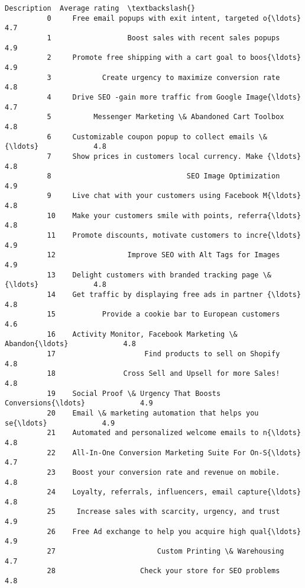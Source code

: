 \documentclass[11pt]{article}
\begin{document}
\begin{Verbatim}[commandchars=\\\{\}]
                                                      Description  Average rating  \textbackslash{}
          0     Free email popups with exit intent, targeted o{\ldots}             4.7   
          1                  Boost sales with recent sales popups             4.9   
          2     Promote free shipping with a cart goal to boos{\ldots}             4.9   
          3            Create urgency to maximize conversion rate             4.8   
          4     Drive SEO -gain more traffic from Google Image{\ldots}             4.7   
          5          Messenger Marketing \& Abandoned Cart Toolbox             4.8   
          6     Customizable coupon popup to collect emails \& {\ldots}             4.8   
          7     Show prices in customers local currency. Make {\ldots}             4.8   
          8                                SEO Image Optimization             4.9   
          9     Live chat with your customers using Facebook M{\ldots}             4.8   
          10    Make your customers smile with points, referra{\ldots}             4.8   
          11    Promote discounts, motivate customers to incre{\ldots}             4.9   
          12                 Improve SEO with Alt Tags for Images             4.9   
          13    Delight customers with branded tracking page \&{\ldots}             4.8   
          14    Get traffic by displaying free ads in partner {\ldots}             4.8   
          15           Provide a cookie bar to European customers             4.6   
          16    Activity Monitor, Facebook Marketing \& Abandon{\ldots}             4.8   
          17                     Find products to sell on Shopify             4.8   
          18                Cross Sell and Upsell for more Sales!             4.8   
          19    Social Proof \& Urgency That Boosts Conversions{\ldots}             4.9   
          20    Email \& marketing automation that helps you se{\ldots}             4.9   
          21    Automated and personalized welcome emails to n{\ldots}             4.8   
          22    All-In-One Conversion Marketing Suite For On-S{\ldots}             4.7   
          23    Boost your conversion rate and revenue on mobile.             4.8   
          24    Loyalty, referrals, influencers, email capture{\ldots}             4.8   
          25     Increase sales with scarcity, urgency, and trust             4.9   
          26    Free Ad exchange to help you acquire high qual{\ldots}             4.9   
          27                        Custom Printing \& Warehousing             4.7   
          28                    Check your store for SEO problems             4.8   

\end{Verbatim}
\end{document}
